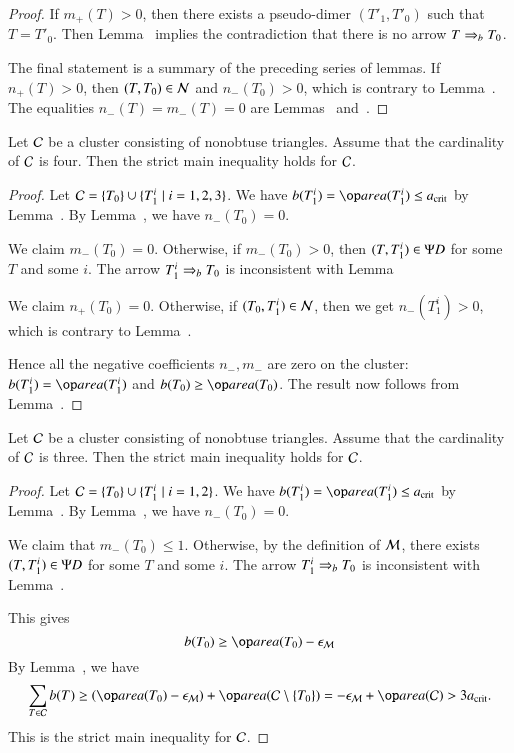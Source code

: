 \begin{proof}
  If $m_+(T)>0$, then there exists a pseudo-dimer $(T'_1,T'_0)$ such
  that $T=T'_0$.  Then Lemma~ implies the
  contradiction that there is no arrow $T\Rightarrow_{b} T_0$.

  The final statement is a summary of the preceding series of lemmas.
   If $n_+(T)>0$, then $(T,T_0)\in\mathcal N$ and $n_-(T_0)>0$, which is contrary
  to Lemma~.    The equalities $n_-(T)=m_-(T)=0$ are
  Lemmas~ and~.
\end{proof}



\begin{lemma}
  Let $\mathcal C$ be a cluster consisting of nonobtuse triangles.  Assume
  that the cardinality of $\mathcal C$ is four.  Then the strict main
  inequality holds for $\mathcal C$.
\end{lemma}

\begin{proof}  
  Let $\mathcal C = \{T_0\}\cup \{T_1^i \mid i=1,2,3\}$.  We have $b(T_1^i) =
  \area(T_1^i)\le \acrit$ by Lemma~.  By
  Lemma~, we have
  $n_-(T_0)=0$.

  We claim $m_-(T_0)=0$.  Otherwise, if $m_-(T_0) >0$, then
  $(T,T_1^i)\in\Psi D$ for some $T$ and some $i$.  The arrow $T_1^i\Rightarrow_{b}
  T_0$ is inconsistent with Lemma~

  We claim $n_+(T_0)=0$.  Otherwise, if $(T_0,T_1^i)\in\mathcal N$, then we
  get $n_-(T_1^i)>0$, which is contrary to Lemma~.

  Hence all the negative coefficients $n_-,m_-$ are zero on the cluster:
  $b(T_1^i)=\area(T_1^i)$ and $b(T_0) \ge \area(T_0)$.  The result now
  follows from Lemma~.
\end{proof}

\begin{lemma}
  Let $\mathcal C$ be a cluster consisting of nonobtuse triangles.  Assume
  that the cardinality of $\mathcal C$ is three.  Then the strict main
  inequality holds for $\mathcal C$.
\end{lemma}

\begin{proof}  
  Let $\mathcal C = \{T_0\}\cup \{T_1^i \mid i=1,2\}$.  We have $b(T_1^i) =
  \area(T_1^i)\le \acrit$ by Lemma~.  By
  Lemma~, we have
  $n_-(T_0)=0$.

  We claim that $m_-(T_0)\le 1$.  Otherwise, by the definition of
  $\mathcal M$, there exists $(T,T_1^i)\in\Psi D$ for some $T$ and some $i$.  The
  arrow $T_1^i\Rightarrow_{b} T_0$ is inconsistent with Lemma~.

This gives
\[
b(T_0) \ge \area(T_0) - \epsM
\]
By Lemma~, we have
\[
\sum_{T\in\C} b(T) \ge (\area(T_0) - \epsM) +  \area(\C\setminus \{T_0\}) 
= -\epsM+ \area(\C) > 3\acrit.
\]
This is the strict main inequality for $\mathcal C$.
\end{proof}

